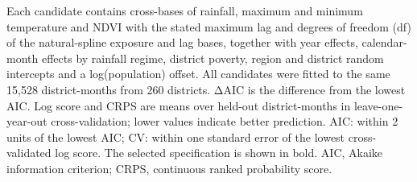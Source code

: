 \documentclass[11pt,a4paper]{article}
\begin{document}
\noindent Each candidate contains cross-bases of rainfall, maximum and minimum temperature and NDVI with the stated maximum lag and degrees of freedom (df) of the natural-spline exposure and lag bases, together with year effects, calendar-month effects by rainfall regime, district poverty, region and district random intercepts and a log(population) offset. All candidates were fitted to the same 15,528 district-months from 260 districts. ΔAIC is the difference from the lowest AIC. Log score and CRPS are means over held-out district-months in leave-one-year-out cross-validation; lower values indicate better prediction. AIC: within 2 units of the lowest AIC; CV: within one standard error of the lowest cross-validated log score. The selected specification is shown in bold. AIC, Akaike information criterion; CRPS, continuous ranked probability score.\par\endgroup
\medskip
\end{document}
